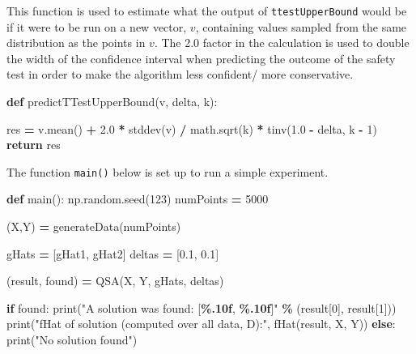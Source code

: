 \documentclass[12pt, twoside]{amherstthesis}
\newenvironment{Shaded}{\begin{snugshade}}{\end{snugshade}}
\newcommand{\BuiltInTok}[1]{#1}
\newcommand{\ControlFlowTok}[1]{\textcolor[rgb]{0.13,0.29,0.53}{\textbf{#1}}}
\newcommand{\DecValTok}[1]{\textcolor[rgb]{0.00,0.00,0.81}{#1}}
\newcommand{\FloatTok}[1]{\textcolor[rgb]{0.00,0.00,0.81}{#1}}
\newcommand{\KeywordTok}[1]{\textcolor[rgb]{0.13,0.29,0.53}{\textbf{#1}}}
\newcommand{\NormalTok}[1]{#1}
\newcommand{\OperatorTok}[1]{\textcolor[rgb]{0.81,0.36,0.00}{\textbf{#1}}}
\newcommand{\SpecialCharTok}[1]{\textcolor[rgb]{0.81,0.36,0.00}{\textbf{#1}}}
\newcommand{\StringTok}[1]{\textcolor[rgb]{0.31,0.60,0.02}{#1}}
\begin{document}
This function is used to estimate what the output of \texttt{ttestUpperBound} would be if it were to be run on a new vector, \(v\), containing values sampled from the same distribution as the points in \(v\). The 2.0 factor in the calculation is used to double the width of the confidence interval when predicting the outcome of the safety test in order to make the algorithm less confident/ more conservative.
\begin{Shaded}
\begin{Highlighting}[]
\KeywordTok{def}\NormalTok{ predictTTestUpperBound(v, delta, k):}
    
\NormalTok{    res }\OperatorTok{=}\NormalTok{ v.mean() }\OperatorTok{+} \FloatTok{2.0} \OperatorTok{*}\NormalTok{ stddev(v) }\OperatorTok{/}\NormalTok{ math.sqrt(k) }\OperatorTok{*}\NormalTok{ tinv(}\FloatTok{1.0} \OperatorTok{{-}}\NormalTok{ delta, }
\NormalTok{    k }\OperatorTok{{-}} \DecValTok{1}\NormalTok{)}
    \ControlFlowTok{return}\NormalTok{ res}
\end{Highlighting}
\end{Shaded}
\noindent The function \texttt{main()} below is set up to run a simple experiment.
\begin{Shaded}
\begin{Highlighting}[]
\KeywordTok{def}\NormalTok{ main():}
\NormalTok{    np.random.seed(}\DecValTok{123}\NormalTok{)  }
\NormalTok{    numPoints }\OperatorTok{=} \DecValTok{5000}   

\NormalTok{    (X,Y)  }\OperatorTok{=}\NormalTok{ generateData(numPoints)  }

\NormalTok{    gHats  }\OperatorTok{=}\NormalTok{ [gHat1, gHat2] }
\NormalTok{    deltas }\OperatorTok{=}\NormalTok{ [}\FloatTok{0.1}\NormalTok{, }\FloatTok{0.1}\NormalTok{]}

\NormalTok{    (result, found) }\OperatorTok{=}\NormalTok{ QSA(X, Y, gHats, deltas) }
    
    \ControlFlowTok{if}\NormalTok{ found:}
        \BuiltInTok{print}\NormalTok{(}\StringTok{"A solution was found: [}\SpecialCharTok{\%.10f}\StringTok{, }\SpecialCharTok{\%.10f}\StringTok{]"} \OperatorTok{\%}\NormalTok{ (result[}\DecValTok{0}\NormalTok{], }
\NormalTok{        result[}\DecValTok{1}\NormalTok{]))}
        \BuiltInTok{print}\NormalTok{(}\StringTok{"fHat of solution (computed over all data, D):"}\NormalTok{, }
\NormalTok{        fHat(result, X, Y))}
    \ControlFlowTok{else}\NormalTok{:}
        \BuiltInTok{print}\NormalTok{(}\StringTok{"No solution found"}\NormalTok{)}
\end{Highlighting}
\end{Shaded}
\end{document}
